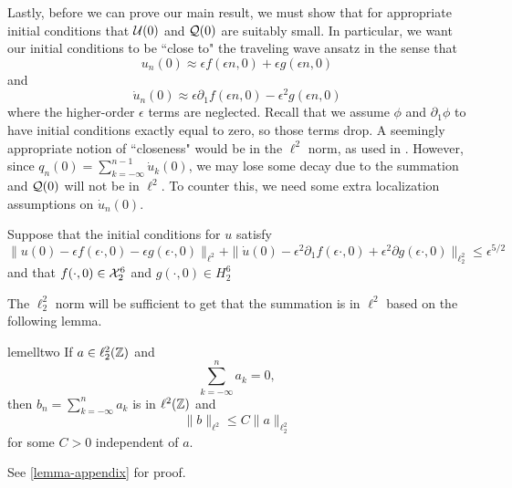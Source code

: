 Lastly, before we can prove our main result, we must show that for appropriate initial conditions that \(\mathcal{U}(0)\) and \(\mathcal{Q}(0)\) are suitably small. In particular, we want our initial conditions to be ``close to" the traveling wave ansatz in the sense that 
\begin{equation}
	u_n(0) \approx \epsilon f(\epsilon n , 0) + \epsilon g(\epsilon n , 0)
\end{equation}
and 
\begin{equation}
	\dot u_n(0) \approx \epsilon \partial_1 f(\epsilon n , 0) -\epsilon^2 g(\epsilon n,0)
\end{equation}
where the higher-order \(\epsilon\) terms are neglected. Recall that we assume \(\phi\) and \(\partial_1\phi\) to have initial conditions exactly equal to zero, so those terms drop. A seemingly appropriate notion of ``closeness" would be in the \(\ell^2\) norm, as used in \cite{khan2017long,schneider2000counter}. However, since \(q_n(0) = \sum_{k=-\infty}^{n-1} \dot u_{k}(0)\), we may lose some decay due to the summation and \(\mathcal{Q}(0)\) will not be in \(\ell^2\). To counter this, we need some extra localization assumptions on \(\dot u_n(0)\).

\begin{assum}\label{assumption-3}
	Suppose that the initial conditions for \(u\) satisfy
	\begin{equation}
		\| u(0) - \epsilon f(\epsilon \cdot, 0) - \epsilon g(\epsilon \cdot, 0) \|_{\ell^2} + \| \dot u(0) - \epsilon^2 \partial_1 f(\epsilon \cdot, 0) + \epsilon^2 \partial g (\epsilon \cdot , 0) \|_{\ell^2_2} \leq \epsilon^{5/2}
	\end{equation}
	and that \(f(\cdot, 0) \in \mathcal{X}^6_2\) and \(g(\cdot, 0) \in H^6_2\)
\end{assum}

The \(\ell^2_2\) norm will be sufficient to get that the summation is in \(\ell^2\) based on the following lemma.
\begin{restatable}{lem}{elltwo}
\label{ell22-lemma}
	If \(a\in \ell^2_2(\mathbb{Z})\) and 
	\begin{equation}
		\sum_{k=-\infty}^n a_k = 0,
	\end{equation}
	then \(b_n = \sum_{k=-\infty}^n a_k\) is in \(\ell^2(\mathbb{Z})\) and 
	\begin{equation}
		\|b\|_{\ell^2} \leq C \|a\|_{\ell^2_2}
	\end{equation}
	for some \(C> 0\) independent of \(a\).
\end{restatable} 
See \cref{lemma-appendix} for proof.


